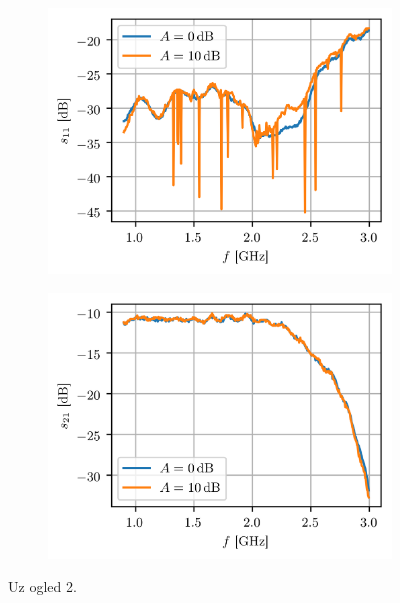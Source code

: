 \documentclass[a4paper, 12pt, diplomski]{etf}
\begin{document}
\begin{figure}[ht!]
    \begin{subfigure}[b]{0.49\textwidth}
        \centering
        \includegraphics[width = 1\textwidth]{fig/s11_att.png}
        \label{fig:s11_att}
    \end{subfigure}
    \begin{subfigure}[b]{0.49\textwidth}
        \centering
        \includegraphics[width = 1\textwidth]{fig/s21_att.png}
        \label{fig:s21_att}
    \end{subfigure}  
    \caption{Uz ogled 2.}
    \label{fig:ogled2}
\end{figure}
\end{document}
